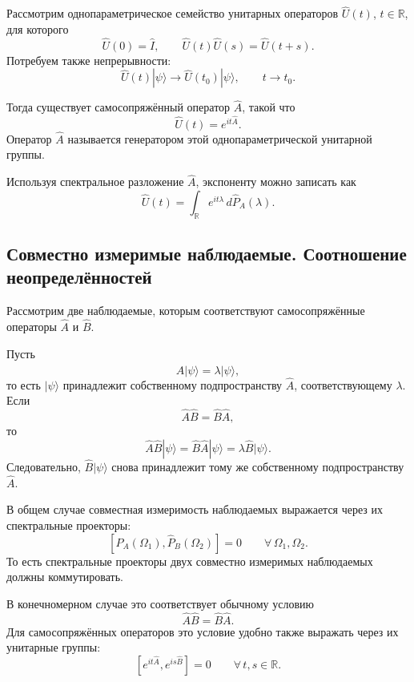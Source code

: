 \documentclass[12pt,a4paper]{article}
\begin{document}
Рассмотрим однопараметрическое семейство унитарных операторов
$\hat U(t)$, $t\in\mathbb R$, для которого
\[
    \boxed{
        \hat U(0)=\hat I,
        \qquad
        \hat U(t)\hat U(s)
        =
        \hat U(t+s)
    }.
\]
Потребуем также непрерывности:
\[
    \boxed{
        \hat U(t)|\psi\rangle
        \longrightarrow
        \hat U(t_0)|\psi\rangle,
        \qquad
        t\to t_0
    }.
\]

Тогда существует самосопряжённый оператор $\hat A$, такой что
\[
    \boxed{
        \hat U(t)=e^{it\hat A}
    }.
\]
Оператор $\hat A$ называется генератором этой однопараметрической
унитарной группы.

Используя спектральное разложение $\hat A$, экспоненту можно записать
как
\[
    \boxed{
        \hat U(t)
        =
        \int_{\mathbb R}
            e^{it\lambda}\,
            d\hat P_A(\lambda)
    }.
\]


\subsection{Совместно измеримые наблюдаемые. Соотношение неопределённостей}

Рассмотрим две наблюдаемые, которым соответствуют самосопряжённые
операторы $\hat A$ и $\hat B$.

Пусть
\[
    \hat A|\psi\rangle
    =
    \lambda|\psi\rangle,
\]
то есть $|\psi\rangle$ принадлежит собственному подпространству
$\hat A$, соответствующему $\lambda$. Если
\[
    \hat A\hat B=\hat B\hat A,
\]
то
\[
    \hat A\hat B|\psi\rangle
    =
    \hat B\hat A|\psi\rangle
    =
    \lambda\hat B|\psi\rangle.
\]
Следовательно, $\hat B|\psi\rangle$ снова принадлежит тому же
собственному подпространству $\hat A$.

В общем случае совместная измеримость наблюдаемых выражается через
их спектральные проекторы:
\[
    \boxed{
        [\hat P_A(\Omega_1),\hat P_B(\Omega_2)]
        =
        0
        \qquad
        \forall\,\Omega_1,\Omega_2
    }.
\]
То есть спектральные проекторы двух совместно измеримых наблюдаемых
должны коммутировать.

В конечномерном случае это соответствует обычному условию
\[
    \boxed{
        \hat A\hat B=\hat B\hat A
    }.
\]
Для самосопряжённых операторов это условие удобно также выражать через
их унитарные группы:
\[
    \boxed{
        [e^{it\hat A},e^{is\hat B}]=0
        \qquad
        \forall\,t,s\in\mathbb R
    }.
\]
\end{document}
